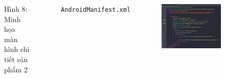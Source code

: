 \documentclass{beamer}
\begin{document}
\begin{frame}
\begin{columns}
\begin{figure}
            \caption{\centering\tiny{Hình 8: Minh họa màn hình chi tiết sản phẩm 2}}
        \end{figure}
        \indent \texttt{AndroidManifest.xml}
        \begin{figure}
            \centering
            \includegraphics[width=\textwidth]{images/33.png}
        \end{figure}
    \end{columns}
\end{frame}
\end{document}
